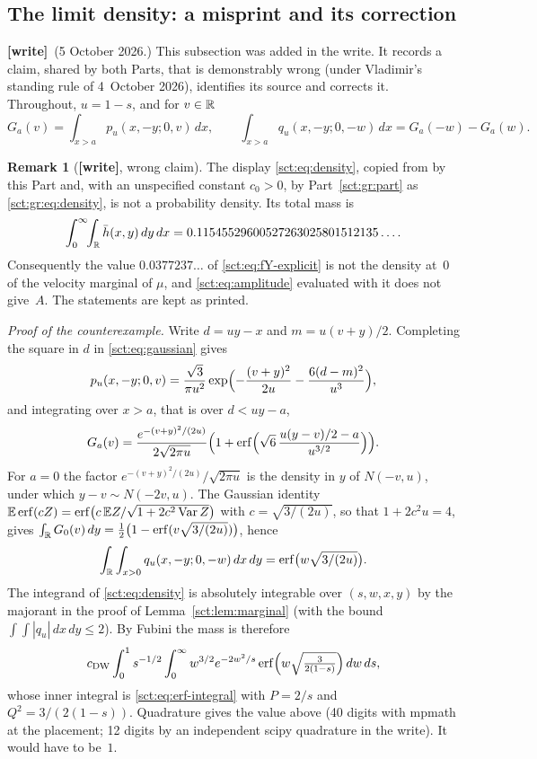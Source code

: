 \documentclass[11pt,letterpaper]{article}
\theoremstyle{definition}\newtheorem{remark}[theorem]{Remark}
\newcommand{\erf}{\operatorname{erf}}
\newcommand{\wtag}{\textup{\textbf{[write]}}}
\begin{document}
\subsection{The limit density: a misprint and its correction}\label{sct:sub:density}
\wtag\ (5 October 2026.) This subsection was added in the write. It records a claim, shared by both Parts, that is demonstrably wrong (under Vladimir's standing rule of 4~October 2026), identifies its source and corrects it. Throughout, $u=1-s$, and for $v\in\mathbb R$
\[
 G_a(v)=\int_{x>a}p_u(x,-y;0,v)\,dx,\qquad
 \int_{x>a}q_u(x,-y;0,-w)\,dx=G_a(-w)-G_a(w).
\]

\begin{remark}[\wtag, wrong claim]\label{sct:rem:misprint}
The display \eqref{sct:eq:density}, copied from \cite[Theorem~1, p.~170]{dw} by this Part and, with an unspecified constant $c_0>0$, by Part~\ref{sct:gr:part} as \eqref{sct:gr:eq:density}, is not a probability density. Its total mass is
\[
 \int_0^\infty\!\!\int_\mathbb R\bar h(x,y)\,dy\,dx=0.11545529600527263025801512135\ldots .
\]
Consequently the value $0.0377237\ldots$ of \eqref{sct:eq:fY-explicit} is not the density at~$0$ of the velocity marginal of $\mu$, and \eqref{sct:eq:amplitude} evaluated with it does not give~$A$. The statements are kept as printed.

\emph{Proof of the counterexample.} Write $d=uy-x$ and $m=u(v+y)/2$. Completing the square in $d$ in \eqref{sct:eq:gaussian} gives
\[
 p_u(x,-y;0,v)=\frac{\sqrt3}{\pi u^2}
 \exp\Bigl(-\frac{(v+y)^2}{2u}-\frac{6(d-m)^2}{u^3}\Bigr),
\]
and integrating over $x>a$, that is over $d<uy-a$,
\[
 G_a(v)=\frac{e^{-(v+y)^2/(2u)}}{2\sqrt{2\pi u}}
 \Bigl(1+\erf\Bigl(\sqrt6\,\frac{u(y-v)/2-a}{u^{3/2}}\Bigr)\Bigr).
\]
For $a=0$ the factor $e^{-(v+y)^2/(2u)}/\sqrt{2\pi u}$ is the density in $y$ of $N(-v,u)$, under which $y-v\sim N(-2v,u)$. The Gaussian identity $\Ee\erf(cZ)=\erf\bigl(c\,\Ee Z/\sqrt{1+2c^2\operatorname{Var}Z}\bigr)$ with $c=\sqrt{3/(2u)}$, so that $1+2c^2u=4$, gives $\int_\R G_0(v)\,dy=\frac12\bigl(1-\erf(v\sqrt{3/(2u)})\bigr)$, hence
\[
 \int_\R\int_{x>0}q_u(x,-y;0,-w)\,dx\,dy=\erf\bigl(w\sqrt{3/(2u)}\bigr).
\]
The integrand of \eqref{sct:eq:density} is absolutely integrable over $(s,w,x,y)$ by the majorant in the proof of Lemma~\ref{sct:lem:marginal} (with the bound $\int\int|q_u|\,dx\,dy\le2$). By Fubini the mass is therefore
\[
 c_{\mathrm{DW}}\int_0^1s^{-1/2}\int_0^\infty w^{3/2}e^{-2w^2/s}
 \erf\Bigl(w\sqrt{\tfrac{3}{2(1-s)}}\Bigr)\,dw\,ds,
\]
whose inner integral is \eqref{sct:eq:erf-integral} with $P=2/s$ and $Q^2=3/(2(1-s))$. Quadrature gives the value above (40 digits with mpmath at the placement; 12 digits by an independent scipy quadrature in the write). It would have to be~$1$.


\end{remark}
\end{document}
